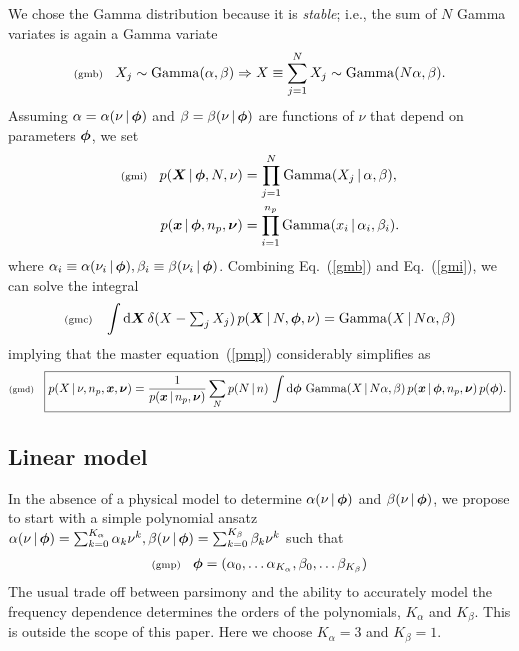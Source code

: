 \documentclass[11pt]{article}
\newcommand{\lleq}[1]{\label{#1} }
\renewcommand{\lleq}[1]{\label{#1} {\scriptstyle {\rm (#1)}} \hspace*{2ex} }
\newcommand{\cond}{\,|\,}
\newcommand{\refeq}[1]{Eq.~(\ref{#1})}
\DeclareMathOperator{\GammaDist}{Gamma}
\newcommand{\Kalpha}{{K_\alpha}}
\newcommand{\Kbeta}{{K_\beta}}
\newcommand{\npack}{{n_p}}
\newcommand{\rmdx}[1]{\mbox{d} #1 \,} %
\begin{document}
We chose the Gamma distribution because it is \emph{stable}; i.e.,
the sum of $N$ Gamma variates is again a Gamma variate
\begin{align}
  \lleq{gmb}
    X_j \sim \GammaDist(\alpha, \beta) \Rightarrow X \equiv \sum_{j=1}^N X_j \sim \GammaDist(N \alpha, \beta).
\end{align}
Assuming $\alpha = \alpha(\nu \cond \bmphi)$ and $\beta = \beta(\nu
\cond \bmphi)$ are functions of $\nu$ that depend on parameters
${\bm{\phi}}$, we set
\begin{align}
  \lleq{gmi}
  p(\bmX \cond \bmphi, N, \nu) &= \prod_{j=1}^N \GammaDist(X_j \cond \alpha, \beta ),\\
  p(\bmx \cond \bmphi, \npack, \bmnu) &= \prod_{i=1}^{\npack} \GammaDist(x_i \cond \alpha_i, \beta_i).
\end{align}
where $\alpha_i \equiv \alpha(\nu_i \cond \bmphi), \beta_i \equiv
\beta(\nu_i \cond \bmphi)$.  Combining \refeq{gmb} and \refeq{gmi}, we
can solve the integral
\begin{align}
  \lleq{gmc}
  \int \rmdx{\bmX} \delta(X - \textstyle\sum_j X_j)
  \,p(\bmX\cond N,\bmphi, \nu) = \GammaDist(X \cond N \alpha, \beta)
\end{align}
implying that the master equation~(\ref{pmp}) considerably simplifies
as
\begin{align}
  \lleq{gmd}
    \boxed{
    p(X\cond \nu, \npack,\bmx,\bmnu)
  = \frac{1}{p(\bmx\cond \npack, \bmnu)}
  \sum_N p(N\cond n)\, \int \rmdx{\bmphi} \GammaDist(X \cond N \alpha, \beta) %
  \, p(\bmx\cond \bmphi, \npack, \bmnu)
  \, p(\bmphi).
  }
\end{align}

\subsection{Linear model}

In the absence of a physical model to determine $\alpha(\nu \cond
\bmphi)$ and $\beta(\nu \cond \bmphi)$, we propose to start with a simple polynomial ansatz   $\alpha(\nu \cond \bmphi) = \sum_{k=0}^\Kalpha \alpha_k \nu^k, \beta(\nu \cond \bmphi) = \sum_{k=0}^\Kbeta \beta_k \nu^k$ such that
\begin{align}
  \lleq{gmp}
  \bmphi = (\alpha_0, \dots \alpha_\Kalpha , \beta_0, \dots \beta_\Kbeta)
\end{align}
The usual trade off between parsimony and the ability to accurately
model the frequency dependence determines the orders of the
polynomials, $\Kalpha$ and $\Kbeta$. This is outside the scope of this
paper. Here we choose $\Kalpha = 3$ and $\Kbeta = 1$.
\end{document}
